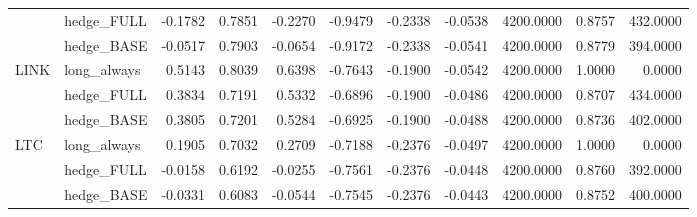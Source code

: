 \begin{tabular}{llrrrrrrrrr}
 & hedge_FULL & -0.1782 & 0.7851 & -0.2270 & -0.9479 & -0.2338 & -0.0538 & 4200.0000 & 0.8757 & 432.0000 \\
 & hedge_BASE & -0.0517 & 0.7903 & -0.0654 & -0.9172 & -0.2338 & -0.0541 & 4200.0000 & 0.8779 & 394.0000 \\
\cline{1-11}
\multirow[t]{3}{*}{LINK} & long_always & 0.5143 & 0.8039 & 0.6398 & -0.7643 & -0.1900 & -0.0542 & 4200.0000 & 1.0000 & 0.0000 \\
 & hedge_FULL & 0.3834 & 0.7191 & 0.5332 & -0.6896 & -0.1900 & -0.0486 & 4200.0000 & 0.8707 & 434.0000 \\
 & hedge_BASE & 0.3805 & 0.7201 & 0.5284 & -0.6925 & -0.1900 & -0.0488 & 4200.0000 & 0.8736 & 402.0000 \\
\cline{1-11}
\multirow[t]{3}{*}{LTC} & long_always & 0.1905 & 0.7032 & 0.2709 & -0.7188 & -0.2376 & -0.0497 & 4200.0000 & 1.0000 & 0.0000 \\
 & hedge_FULL & -0.0158 & 0.6192 & -0.0255 & -0.7561 & -0.2376 & -0.0448 & 4200.0000 & 0.8760 & 392.0000 \\
 & hedge_BASE & -0.0331 & 0.6083 & -0.0544 & -0.7545 & -0.2376 & -0.0443 & 4200.0000 & 0.8752 & 400.0000 \\
\cline{1-11}
\bottomrule
\end{tabular}
